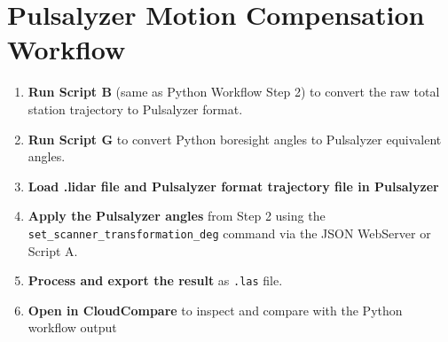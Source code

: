 \section{Pulsalyzer Motion Compensation Workflow}
\begin{enumerate}
    \item \textbf{Run Script B} (same as Python Workflow Step 2) to convert the raw total station trajectory to Pulsalyzer format.
    \item \textbf{Run Script G} to convert Python boresight angles to Pulsalyzer equivalent angles.
    \item \textbf{Load .lidar file and Pulsalyzer format trajectory file in Pulsalyzer}
    \item \textbf{Apply the Pulsalyzer angles} from Step 2 using the \texttt{set\_scanner\_transformation\_deg} command via the JSON WebServer or Script A.
    \item \textbf{Process and export the result} as \texttt{.las} file.
    \item \textbf{Open in CloudCompare} to inspect and compare with the Python workflow output
\end{enumerate}
